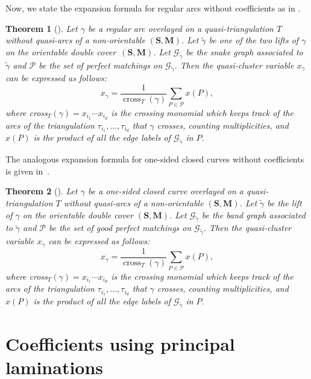 \documentclass[10pt,a4paper]{amsart}
\numberwithin{equation}{section}
\newtheorem{Theorem}{Theorem}[section]
\theoremstyle{definition}
\newcommand{\SM}{(\mathbf{S}, \mathbf{M})}
\begin{document}
Now, we state the expansion formula for regular arcs without coefficients as in \cite[Theorem~5.3]{Wil19}.

\begin{Theorem}[\cite{Wil19}]\label{theorem:expformularegarcs}
 Let $\gamma$ be a regular arc overlayed on a quasi-triangulation $T$ without quasi-arcs of a non-orientable $\SM$. Let $\tilde{\gamma}$ be one of the two lifts of $\gamma$ on the orientable double cover~$\SM$. Let $\mathcal{G}_{\tilde{\gamma}}$ be the snake graph associated to $\tilde{\gamma}$ and $\mathcal{P}$ be the set of perfect matchings on $\mathcal{G}_{\tilde{\gamma}}$. Then the quasi-cluster variable $x_\gamma$ can be expressed as follows:
 \[x_\gamma = \frac{1}{\operatorname{cross}_T(\gamma)} \sum_{P \in \mathcal{P}} x(P),\]
 where cross$_T(\gamma) = x_{i_1} \cdots x_{i_d}$ is the crossing monomial which keeps track of the arcs of the triangulation $\tau_{i_1}, \dots, \tau_{i_d}$ that $\gamma$ crosses, counting multiplicities, and $x(P)$ is the product of all the edge labels of $\mathcal{G}_{\tilde{\gamma}}$ in $P$.
\end{Theorem}

The analogous expansion formula for one-sided closed curves without coefficients is given in~\cite[Theorem 5.19]{Wil19}.

\begin{Theorem}[{\cite{Wil19}}]\label{theorem:expformulaquasiarcsnocoeff}
 Let $\gamma$ be a one-sided closed curve overlayed on a quasi-triangulation $T$ without quasi-arcs of a non-orientable $\SM$. Let $\tilde{\gamma}$ be the lift of $\gamma$ on the orientable double cover $\SM$. Let $\mathcal{G}_{\tilde{\gamma}}$ be the band graph associated to $\tilde{\gamma}$ and $\mathcal{P}$ be the set of good perfect matchings on $\mathcal{G}_{\tilde{\gamma}}$. Then the quasi-cluster variable $x_\gamma$ can be expressed as follows:
 \[x_\gamma = \frac{1}{\operatorname{cross}_T(\gamma)} \sum_{P \in \mathcal{P}} x(P),\]
 where cross$_T(\gamma) = x_{i_1} \cdots x_{i_d}$ is the crossing monomial which keeps track of the arcs of the triangulation $\tau_{i_1}, \dots, \tau_{i_d}$ that $\gamma$ crosses, counting multiplicities, and $x(P)$ is the product of all the edge labels of $\mathcal{G}_{\tilde{\gamma}}$ in $P$.
\end{Theorem}

\section{Coefficients using principal laminations}\label{section:coefficients}
\end{document}
